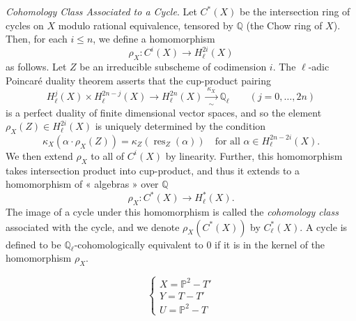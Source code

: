 \documentclass[11pt,a4paper]{article}
\begin{document}
\emph{Cohomology Class Associated to a Cycle}. Let $C^{*}(X)$ be the
intersection ring of cycles on $X$ modulo rational equivalence,
tensored by $\mathbb{Q}$ (the Chow ring of $X$). Then, for each $i
\leqslant n$, we define a homomorphism
\[
  \rho_{X} : C^{i}(X) \longrightarrow H^{2i}_{\ell}(X)
\]
as follows. Let $Z$ be an irreducible subscheme of codimension $i$. The
$\ell$-adic Poincaré duality theorem asserts that the cup-product pairing
\[
  H^{j}_{\ell}(X) \times H^{2n-j}_{\ell}(X) \longrightarrow H^{2n}_{\ell}(X) \xrightarrow[\ \sim\ ]{\ \kappa_{X}\ } \mathbb{Q}_{\ell} \qquad (j = 0, \ldots, 2n)
\]
is a perfect duality of finite dimensional vector spaces, and so the element
$\rho_{X}(Z) \in H^{2i}_{\ell}(X)$ is uniquely determined by the condition
\[
  \kappa_{X}(\alpha \cdot \rho_{X}(Z)) = \kappa_{Z}(\operatorname{res}_{Z}(\alpha)) \quad \text{for all } \alpha \in H^{2n-2i}_{\ell}(X) .
\]
We then extend $\rho_{X}$ to all of $C^{i}(X)$ by linearity. Further, this
homomorphism takes intersection product into cup-product, and thus it extends
to a homomorphism of « algebras »  over $\mathbb{Q}$
\[
  \rho_{X} : C^{*}(X) \longrightarrow H^{*}_{\ell}(X) .
\]
The image of a cycle under this homomorphism is called the \emph{cohomology
class} associated with the cycle, and we denote $\rho_{X}(C^{*}(X))$ by
$C^{*}_{\ell}(X)$. A cycle is defined to be $\mathbb{Q}_{\ell}$-cohomologically
equivalent to $0$ if it is in the kernel of the homomorphism $\rho_{X}$.

\[
  \left\{
  \begin{array}{l}
    X = \mathbb{P}^{2} - T' \\
    Y = T - T' \\
    U = \mathbb{P}^{2} - T
  \end{array}
  \right.
\]



\end{document}
